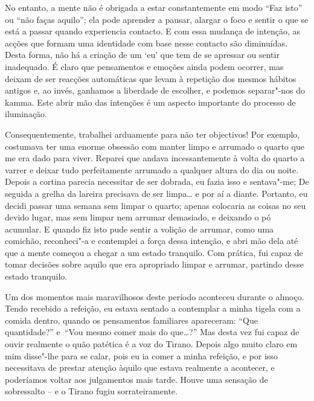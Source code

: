 No entanto, a mente não é obrigada a estar constantemente em modo “Faz
isto” ou “não faças aquilo”; ela pode aprender a pausar, alargar o foco
e sentir o que se está a passar quando experiencia contacto. E com essa
mudança de intenção, as acções que formam uma identidade com base nesse
contacto são diminuídas. Desta forma, não há a criação de um `eu' que
tem de se apressar ou sentir inadequado. É claro que pensamentos e
emoções ainda podem ocorrer, mas deixam de ser reacções automáticas que
levam à repetição dos mesmos hábitos antigos e, ao invés, ganhamos a
liberdade de escolher, e podemos separar"-nos do kamma. Este abrir mão
das intenções é um aspecto importante do processo de iluminação.

\sectionBreak

Consequentemente, trabalhei arduamente para não ter objectivos! Por
exemplo, costumava ter uma enorme obsessão com manter limpo e arrumado o
quarto que me era dado para viver. Reparei que andava incessantemente à
volta do quarto a varrer e deixar tudo perfeitamente arrumado a qualquer
altura do dia ou noite. Depois a cortina parecia necessitar de ser
dobrada, eu fazia isso e sentava"-me; De seguida a grelha da lareira
precisava de ser limpa\ldots{} e por aí a diante. Portanto, eu decidi passar
uma semana sem limpar o quarto; apenas colocaria as coisas no seu devido
lugar, mas sem limpar nem arrumar demasiado, e deixando o pó acumular. E
quando fiz isto pude sentir a volição de arrumar, como uma comichão,
reconheci"-a e contemplei a força dessa intenção, e abri mão dela até que
a mente começou a chegar a um estado tranquilo. Com prática, fui capaz
de tomar decisões sobre aquilo que era apropriado limpar e arrumar,
partindo desse estado tranquilo.

\enlargethispage*{\baselineskip}

Um dos momentos mais maravilhosos deste período aconteceu durante o
almoço. Tendo recebido a refeição, eu estava sentado a contemplar a
minha tigela com a comida dentro, quando os pensamentos familiares
apareceram: “Que quantidade?” e~“Vou mesmo comer mais do que\ldots{}?” Mas
desta vez fui capaz de ouvir realmente o quão patética é a voz do
Tirano. Depois algo muito claro em mim disse"-lhe para se calar, pois eu
ia comer a minha refeição, e por isso necessitava de prestar atenção
àquilo que estava realmente a acontecer, e poderíamos voltar aos
julgamentos mais tarde. Houve uma sensação de sobressalto -- e o Tirano
fugiu sorrateiramente.

\enlargethispage*{\baselineskip}

